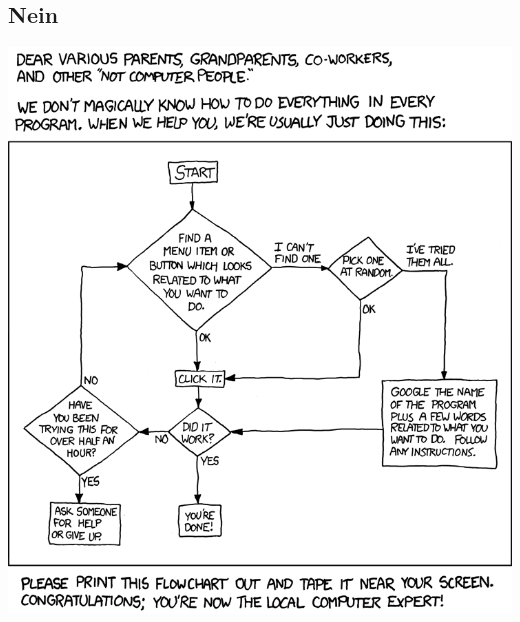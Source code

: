 \documentclass[12pt,a4paper]{scrartcl}
\begin{document}
    \subsection{Nein}
    \includegraphics[width=\textwidth]{comics/tech_support_cheat_sheet.png}
    
    \newpage
    \label{fachschaftsarbeit}
\end{document}
